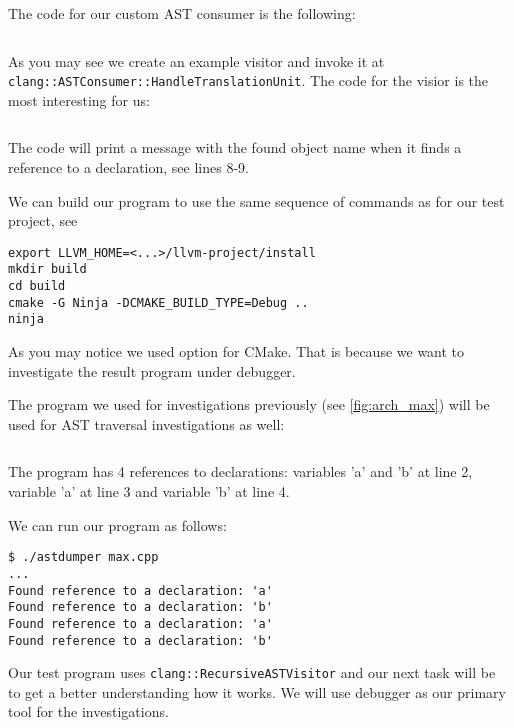 The code for our custom AST consumer is the following:
\inputminted{c++}{src/part1/ch3_ast/astdumper/Consumer.hpp}

As you may see we create an example visitor and invoke it at
\texttt{clang::ASTConsumer::HandleTranslationUnit}. The code for the
visior is the most interesting for us:
\inputminted{c++}{src/part1/ch3_ast/astdumper/Visitor.hpp}
The code will print a message with the found object name when it finds a
reference to a declaration, see lines 8-9. 

We can build our program to use the same sequence of commands as for our test
project, see 
\begin{adjustwidth}{0em}{0em}
\begin{verbatim}
export LLVM_HOME=<...>/llvm-project/install
mkdir build
cd build
cmake -G Ninja -DCMAKE_BUILD_TYPE=Debug ..
ninja
\end{verbatim}
\end{adjustwidth}
As you may notice we used  option
for CMake. That is because we want to investigate the result program under
debugger. 

The program we used for investigations previously (see \cref{fig:arch_max}) will
be used for AST traversal investigations as well:
\inputminted{c++}{./src/part1/ch2_arch/max.cpp}
The program has 4 references to declarations: variables 'a' and 'b' at line 2,
variable 'a' at line 3 and variable 'b' at line 4.

We can run our program as follows:
\begin{adjustwidth}{0em}{0em}
\begin{verbatim}
$ ./astdumper max.cpp 
...
Found reference to a declaration: 'a'
Found reference to a declaration: 'b'
Found reference to a declaration: 'a'
Found reference to a declaration: 'b'
\end{verbatim}
\end{adjustwidth}

Our test program uses \texttt{clang::RecursiveASTVisitor} and our next
task will be to get a better understanding how it works. We will use \lldb
debugger as our primary tool for the investigations.

